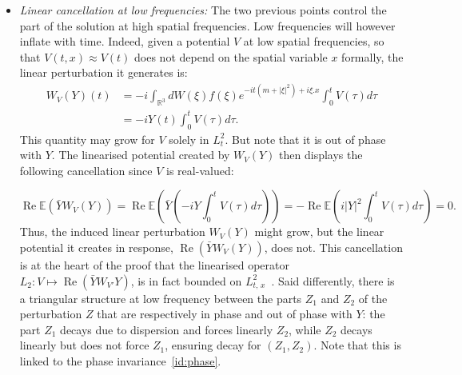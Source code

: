 \documentclass[AHL, Unicode, longabstracts,published]{cedram}
\newcommand{\R}{\mathbb{R}}
\newcommand{\E}{\mathbb{E}}
\DeclareMathOperator{\Rel}{Re}
\begin{document}
\begin{itemize}
\item \emph{Linear cancellation at low frequencies:} The two previous points control the part of the solution at high spatial frequencies. Low frequencies will however inflate with time. Indeed, given a potential $V$ at low spatial frequencies, so that $V(t,x)\approx V(t)$ does not depend on the spatial variable $x$ formally, the linear perturbation it generates is:
\begin{equation} \label{id:formalcomputlowfreq}
\begin{split}
W_V (Y)(t) &=-i \int_{\R^3} dW(\xi) f(\xi) e^{-it\left(m+ |\xi|^2\right)+i\xi.x} \int_{0}^t V(\tau)d\tau \\
&=-iY(t)\int_0^t V(\tau)d\tau.
\end{split}
\end{equation}
This quantity may grow for $V$ solely in $L^2_t$. But note that it is out of phase with $Y$. The linearised potential created by $W_V (Y)$ then displays the following cancellation since $V$ is real-valued:

\[
\Rel \E \left(\bar YW_V (Y)\right)= \Rel \E \left(\bar Y \left(-iY\int_0^t V(\tau)d\tau \right)\right)=- \Rel \E \left(i |Y|^2\int_0^t V(\tau)d\tau \right)=0.
\]
Thus, the induced linear perturbation $W_V (Y)$ might grow, but the linear potential it creates in response, $\Rel (\bar Y W_V (Y))$, does not. This cancellation is at the heart of the proof that the linearised operator $L_2:V\mapsto \Rel (\bar Y W_{V'} Y)$, is in fact bounded on $L^2_{t,\,x}$~\cite{lewsab2}. Said differently, there is a triangular structure at low frequency between the parts $Z_1$ and $Z_2$ of the perturbation $Z$ that are respectively in phase and out of phase with $Y$: the part $Z_1$ decays due to dispersion and forces linearly $Z_2$, while $Z_2$ decays linearly but does not force $Z_1$, ensuring decay for $(Z_1,Z_2)$. Note that this is linked to the phase invariance~\eqref{id:phase}.


\end{itemize}
\end{document}

